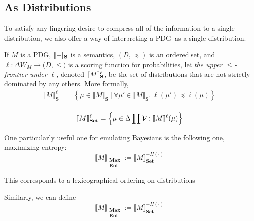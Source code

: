 \documentclass{article}
\newcommand{\MN}{PDG}
\newcommand\Set{\textbf{Set}}
\newcommand\MaxEnt{{\substack{\mathbf{Max}\\\mathbf{Ent}}}}
\begin{document}
	
	\subsection{As Distributions}
	
	To satisfy any lingering desire to compress all of the information to a single distribution, we also offer a way of interpreting a \MN\ as a single distribution.
	
	\begin{defn}
		If  $M$ is a \MN, $\llbracket-\rrbracket_{\mathbf S}$ is a semantics, $(D, \preceq)$ is an ordered set, and $\ell : \Delta W_M \to \mathbb (D, \leq)$ is a scoring function for probabilities, let \emph{the upper $\leq$-frontier under $\ell$}, denoted $\llbracket M\rrbracket_{\mathbf S}^\ell$, be the set of distributions that are not strictly dominated by any others. More formally,
		\begin{align*}
			\llbracket M \rrbracket_{\mathbf S}^\ell &=  \left\{\mu \in \llbracket M \rrbracket_{\mathbf S} ~\Big|~ \forall \mu' \in \llbracket M \rrbracket_{\mathbf S}.~ \ell(\mu') \preceq \ell(\mu)  \right\} \\
		\end{align*}
	\end{defn}

	\begin{fact}
		\[ \bbr{M}_{\Set}^\ell = \left\{\mu \in \Delta\prod \mathcal V :\bbr{M}^\ell(\mu) \right\} \]
	\end{fact}
	
	One particularly useful one for emulating Bayesians is the following one, maximizing entropy:
	\[ \Big\llbracket M \Big\rrbracket_\MaxEnt := \Big\llbracket M \Big\rrbracket_\Set^{-H(\cdot)} \]
	
	This corresponds to a lexicographical ordering on distributions
	
	Similarly, we can define 
	\[ \Big\llbracket M \Big\rrbracket_\MaxEnt := \Big\llbracket M \Big\rrbracket_\Set^{-H(\cdot)} \]
		
\end{document}
